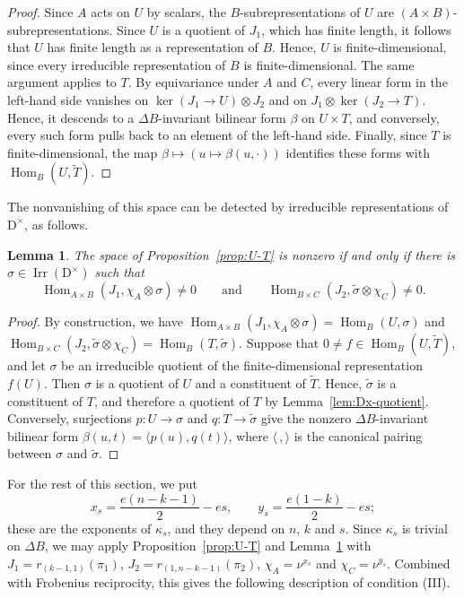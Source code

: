 \documentclass[11pt]{amsart}
\numberwithin{equation}{section}
\theoremstyle{plain}
\newtheorem{lemma}[theorem]{Lemma}
\theoremstyle{definition}
\theoremstyle{remark}
\DeclareMathOperator{\Hom}{Hom}
\DeclareMathOperator{\Irr}{Irr}
\begin{document}
\begin{proof}
	Since $A$ acts on $U$ by scalars, the $B$-subrepresentations of $U$ are $(A\times B)$-subrepresentations. Since $U$ is a quotient of $J_1$, which has finite length, it follows that $U$ has finite length as a representation of $B$. Hence, $U$ is finite-dimensional, since every irreducible representation of $B$ is finite-dimensional. The same argument applies to $T$. By equivariance under $A$ and $C$, every linear form in the left-hand side vanishes on $\ker(J_1\to U)\otimes J_2$ and on $J_1\otimes\ker(J_2\to T)$. Hence, it descends to a $\Delta B$-invariant bilinear form $\beta$ on $U\times T$, and conversely, every such form pulls back to an element of the left-hand side. Finally, since $T$ is finite-dimensional, the map $\beta\mapsto(u\mapsto\beta(u,\cdot))$ identifies these forms with $\Hom_B(U,\widetilde T)$.
\end{proof}

The nonvanishing of this space can be detected by irreducible representations of $\mathrm{D}^\times$, as follows.

\begin{lemma}\label{lem:U-T-criterion}
	The space of Proposition~\ref{prop:U-T} is nonzero if and only if there is $\sigma\in\Irr(\mathrm{D}^\times)$ such that
	$$
	\Hom_{A\times B}(J_1,\chi_A\otimes\sigma)\ne0\qquad\text{and}\qquad\Hom_{B\times C}(J_2,\widetilde\sigma\otimes\chi_C)\ne0.
	$$
\end{lemma}

\begin{proof}
	By construction, we have $\Hom_{A\times B}(J_1,\chi_A\otimes\sigma)=\Hom_B(U,\sigma)$ and $\Hom_{B\times C}(J_2,\widetilde\sigma\otimes\chi_C)=\Hom_B(T,\widetilde\sigma)$. Suppose that $0\ne f\in\Hom_B(U,\widetilde T)$, and let $\sigma$ be an irreducible quotient of the finite-dimensional representation $f(U)$. Then $\sigma$ is a quotient of $U$ and a constituent of $\widetilde T$. Hence, $\widetilde\sigma$ is a constituent of $T$, and therefore a quotient of $T$ by Lemma~\ref{lem:Dx-quotient}. Conversely, surjections $p\colon U\to\sigma$ and $q\colon T\to\widetilde\sigma$ give the nonzero $\Delta B$-invariant bilinear form $\beta(u,t)=\langle p(u),q(t)\rangle$, where $\langle\,,\rangle$ is the canonical pairing between $\sigma$ and $\widetilde\sigma$.
\end{proof}

For the rest of this section, we put
$$
x_s=\frac{e(n-k-1)}2-es,\qquad y_s=\frac{e(1-k)}2-es;
$$
these are the exponents of $\kappa_s$, and they depend on $n$, $k$ and $s$. Since $\kappa_s$ is trivial on $\Delta B$, we may apply Proposition~\ref{prop:U-T} and Lemma~\ref{lem:U-T-criterion} with $J_1=r_{(k-1,1)}(\pi_1)$, $J_2=r_{(1,n-k-1)}(\pi_2)$, $\chi_A=\nu^{x_s}$ and $\chi_C=\nu^{y_s}$. Combined with Frobenius reciprocity, this gives the following description of condition (III).
\end{document}
